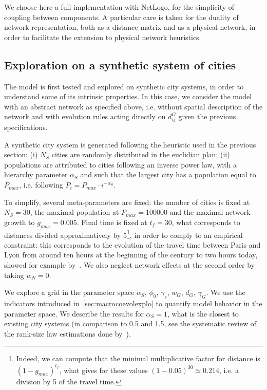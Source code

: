We choose here a full implementation with NetLogo, for the simplicity of coupling between components. A particular care is taken for the duality of network representation, both as a distance matrix and as a physical network, in order to facilitate the extension to physical network heuristics.



\subsection{Exploration on a synthetic system of cities}


The model is first tested and explored on synthetic city systems, in order to understand some of its intrinsic properties. In this case, we consider the model with an abstract network as specified above, i.e. without spatial description of the network and with evolution rules acting directly on $d^G_{ij}$ given the previous specifications. 


A synthetic city system is generated following the heuristic used in the previous section: (i) $N_S$ cities are randomly distributed in the euclidian plan; (ii) populations are attributed to cities following an inverse power law, with a hierarchy parameter $\alpha_S$ and such that the largest city has a population equal to $P_{max}$, i.e. following $P_i = P_{max} \cdot i^{-\alpha_S}$.


To simplify, several meta-parameters are fixed: the number of cities is fixed at $N_S = 30$, the maximal population at $P_{max} = 100000$ and the maximal network growth to $g_{max} = 0.005$. Final time is fixed at $t_f = 30$, what corresponds to distances divided approximatively by 5\footnote{Indeed, we can compute that the minimal multiplicative factor for distance is $(1 - g_{max})^{t_f}$, what gives for these values $(1 - 0.05)^{30} \simeq 0.214$, i.e. a division by 5 of the travel time.}, in order to comply to an empirical constraint: this corresponds to the evolution of the travel time between Paris and Lyon from around ten hours at the beginning of the century to two hours today, showed for example by~\cite{thevenin2013mapping}. We also neglect network effects at the second order by taking $w_N = 0$.


We explore a grid in the parameter space $\alpha_S$, $\phi_0$, $\gamma_s$, $w_G$, $d_G$, $\gamma_G$. We use the indicators introduced in~\ref{sec:macrocoevolexplo} to quantify model behavior in the parameter space. We describe the results for $\alpha_S = 1$, what is the closest to existing city systems (in comparison to 0.5 and 1.5, see the systematic review of the rank-size law estimations done by~\cite{10.1371/journal.pone.0183919}).



